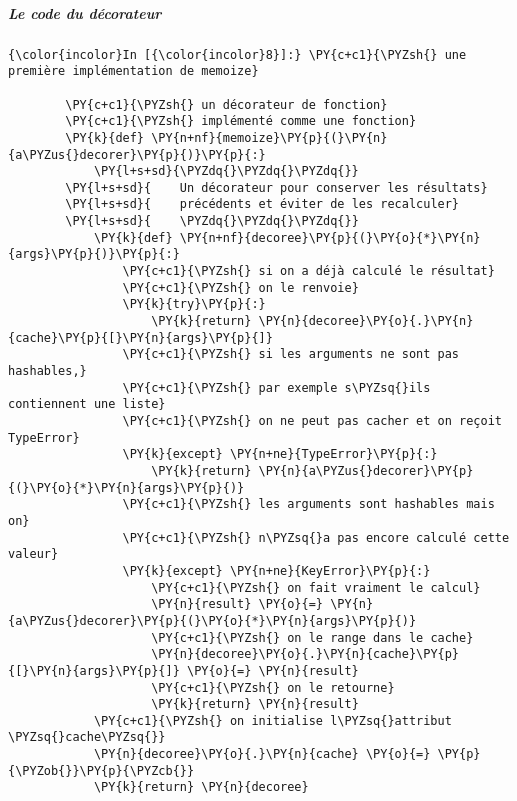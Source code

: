     \hypertarget{le-code-du-duxe9corateur}{%
\subparagraph{Le code du décorateur}\label{le-code-du-duxe9corateur}}

    \begin{Verbatim}[commandchars=\\\{\}]
{\color{incolor}In [{\color{incolor}8}]:} \PY{c+c1}{\PYZsh{} une première implémentation de memoize}
        
        \PY{c+c1}{\PYZsh{} un décorateur de fonction}
        \PY{c+c1}{\PYZsh{} implémenté comme une fonction}
        \PY{k}{def} \PY{n+nf}{memoize}\PY{p}{(}\PY{n}{a\PYZus{}decorer}\PY{p}{)}\PY{p}{:}
            \PY{l+s+sd}{\PYZdq{}\PYZdq{}\PYZdq{}}
        \PY{l+s+sd}{    Un décorateur pour conserver les résultats}
        \PY{l+s+sd}{    précédents et éviter de les recalculer}
        \PY{l+s+sd}{    \PYZdq{}\PYZdq{}\PYZdq{}}
            \PY{k}{def} \PY{n+nf}{decoree}\PY{p}{(}\PY{o}{*}\PY{n}{args}\PY{p}{)}\PY{p}{:}
                \PY{c+c1}{\PYZsh{} si on a déjà calculé le résultat}
                \PY{c+c1}{\PYZsh{} on le renvoie}
                \PY{k}{try}\PY{p}{:}
                    \PY{k}{return} \PY{n}{decoree}\PY{o}{.}\PY{n}{cache}\PY{p}{[}\PY{n}{args}\PY{p}{]}
                \PY{c+c1}{\PYZsh{} si les arguments ne sont pas hashables,}
                \PY{c+c1}{\PYZsh{} par exemple s\PYZsq{}ils contiennent une liste}
                \PY{c+c1}{\PYZsh{} on ne peut pas cacher et on reçoit TypeError}
                \PY{k}{except} \PY{n+ne}{TypeError}\PY{p}{:}
                    \PY{k}{return} \PY{n}{a\PYZus{}decorer}\PY{p}{(}\PY{o}{*}\PY{n}{args}\PY{p}{)}
                \PY{c+c1}{\PYZsh{} les arguments sont hashables mais on}
                \PY{c+c1}{\PYZsh{} n\PYZsq{}a pas encore calculé cette valeur}
                \PY{k}{except} \PY{n+ne}{KeyError}\PY{p}{:}
                    \PY{c+c1}{\PYZsh{} on fait vraiment le calcul}
                    \PY{n}{result} \PY{o}{=} \PY{n}{a\PYZus{}decorer}\PY{p}{(}\PY{o}{*}\PY{n}{args}\PY{p}{)}
                    \PY{c+c1}{\PYZsh{} on le range dans le cache}
                    \PY{n}{decoree}\PY{o}{.}\PY{n}{cache}\PY{p}{[}\PY{n}{args}\PY{p}{]} \PY{o}{=} \PY{n}{result}
                    \PY{c+c1}{\PYZsh{} on le retourne}
                    \PY{k}{return} \PY{n}{result}
            \PY{c+c1}{\PYZsh{} on initialise l\PYZsq{}attribut \PYZsq{}cache\PYZsq{}}
            \PY{n}{decoree}\PY{o}{.}\PY{n}{cache} \PY{o}{=} \PY{p}{\PYZob{}}\PY{p}{\PYZcb{}}
            \PY{k}{return} \PY{n}{decoree}
\end{Verbatim}


